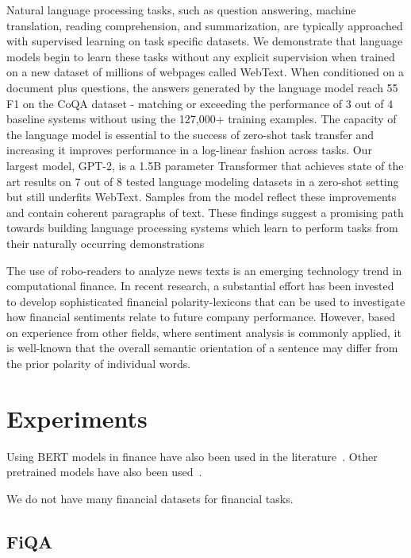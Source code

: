 \documentclass[11pt]{article}
\begin{document}
Natural language processing tasks, such as question answering, machine translation, reading comprehension, and summarization, are typically
approached with supervised learning on task specific datasets. We demonstrate that language
models begin to learn these tasks without any explicit supervision when trained on a new dataset
of millions of webpages called WebText. When conditioned on a document plus questions, the answers generated by the language model reach 55
F1 on the CoQA dataset - matching or exceeding the performance of $3$ out of $4$ baseline systems
without using the 127,000+ training examples. The capacity of the language model is essential
to the success of zero-shot task transfer and increasing it improves performance in a log-linear
fashion across tasks. Our largest model, GPT-2, is a 1.5B parameter Transformer that achieves
state of the art results on 7 out of 8 tested language modeling datasets in a zero-shot setting
but still underfits WebText. Samples from the model reflect these improvements and contain coherent paragraphs of text. These findings suggest
a promising path towards building language processing systems which learn to perform tasks from
their naturally occurring demonstrations~\cite{radford2019} 

The use of robo-readers to analyze news texts is an emerging technology trend in computational finance. In recent
research, a substantial effort has been invested to develop sophisticated financial polarity-lexicons that can be used to
investigate how financial sentiments relate to future company performance. However, based on experience from other
fields, where sentiment analysis is commonly applied, it is well-known
that the overall semantic orientation of a sentence may differ from
the prior polarity of individual words.


\section{Experiments}

Using BERT models in finance have also been used in the
literature~\cite{araci2019, yang2020}. Other pretrained models have
also been used~\cite{yang2018}.

We do not have many financial datasets for financial tasks.


\subsection{FiQA}
\end{document}

